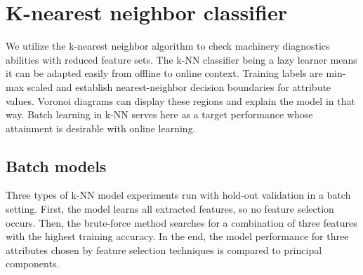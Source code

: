 \section{K-nearest neighbor classifier}
We utilize the k-nearest neighbor algorithm to check machinery diagnostics abilities with reduced feature sets. The k-NN classifier being a lazy learner means it can be adapted easily from offline to online context. Training labels are min-max scaled and establish nearest-neighbor decision boundaries for attribute values. Voronoi diagrams can display these regions and explain the model in that way. Batch learning in k-NN serves here as a target performance whose attainment is desirable with online learning.

\subsection{Batch models}
Three types of k-NN model experiments run with hold-out validation in a batch setting. First, the model learns all extracted features, so no feature selection occurs. Then, the brute-force method searches for a combination of three features with the highest training accuracy. In the end, the model performance for three attributes chosen by feature selection techniques is compared to principal components.

